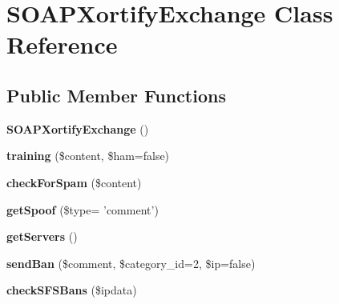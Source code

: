 \hypertarget{class_s_o_a_p_xortify_exchange}{\section{S\-O\-A\-P\-Xortify\-Exchange Class Reference}
\label{class_s_o_a_p_xortify_exchange}
}
\subsection*{Public Member Functions}
\begin{DoxyCompactItemize}
\item 
\hypertarget{class_s_o_a_p_xortify_exchange_aa822fb4cff3861c4caebee64ea8277a8}{{\bfseries S\-O\-A\-P\-Xortify\-Exchange} ()}\label{class_s_o_a_p_xortify_exchange_aa822fb4cff3861c4caebee64ea8277a8}

\item 
\hypertarget{class_s_o_a_p_xortify_exchange_acc16f21b4a84adc36fc8b9440ec3f616}{{\bfseries training} (\$content, \$ham=false)}\label{class_s_o_a_p_xortify_exchange_acc16f21b4a84adc36fc8b9440ec3f616}

\item 
\hypertarget{class_s_o_a_p_xortify_exchange_acb733dd60506b066aae2078b724fe69e}{{\bfseries check\-For\-Spam} (\$content)}\label{class_s_o_a_p_xortify_exchange_acb733dd60506b066aae2078b724fe69e}

\item 
\hypertarget{class_s_o_a_p_xortify_exchange_ae8c876acf75f4c58f1d2e7b942d34b97}{{\bfseries get\-Spoof} (\$type= 'comment')}\label{class_s_o_a_p_xortify_exchange_ae8c876acf75f4c58f1d2e7b942d34b97}

\item 
\hypertarget{class_s_o_a_p_xortify_exchange_a12c6e726fee55c3a10986cb3b1623b6f}{{\bfseries get\-Servers} ()}\label{class_s_o_a_p_xortify_exchange_a12c6e726fee55c3a10986cb3b1623b6f}

\item 
\hypertarget{class_s_o_a_p_xortify_exchange_a89263300393fabde2fa3de91239befc1}{{\bfseries send\-Ban} (\$comment, \$category\-\_\-id=2, \$ip=false)}\label{class_s_o_a_p_xortify_exchange_a89263300393fabde2fa3de91239befc1}

\item 
\hypertarget{class_s_o_a_p_xortify_exchange_ac94438dbc78760c6f9585c0178003e19}{{\bfseries check\-S\-F\-S\-Bans} (\$ipdata)}\label{class_s_o_a_p_xortify_exchange_ac94438dbc78760c6f9585c0178003e19}


\end{DoxyCompactItemize}
